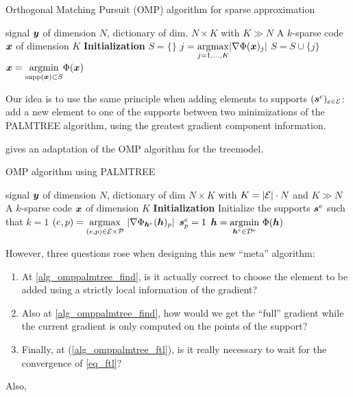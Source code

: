 \begin{algorithm}[!ht]
    \caption{Orthogonal Matching Pursuit (OMP) algorithm for sparse approximation}\label{alg_omp}
  \begin{algorithmic}[1]
    \Input signal $\bm{y}$ of dimension $N$, dictionary of dim. $N \times K$ with $K \gg N$
    \Output A $k$-sparse code $\bm{x}$ of dimension $K$
    \State \textbf{Initialization} $S=\{\}$
      \State $j =  \underset{j = 1,\dots,K}{\operatorname*{\arg\!\max}} | \nabla \Phi(\bm{x})_j |$ \label{alg_omp_pick_correlation}
      \State $S = S \cup \{j\}$
      \State $\bm{x} = \underset{\text{supp}(\bm{x}) \subset S}{\operatorname{argmin}} \Phi(\bm{x})$
    \EndFor
  \end{algorithmic}
\end{algorithm}

Our idea is to use the same principle when adding elements to supports $(\bm{s}^e)_{e \in \mathcal E}$: add a new element to one of the supports between two minimizations of the \ac{PALMTREE} algorithm, using the greatest gradient component information.

 gives an adaptation of the \ac{OMP} algorithm for the \gls{treemodel}.

\begin{algorithm}[!ht]
    \caption{\ac{OMP} algorithm using \ac{PALMTREE}}\label{alg_omppalmtree}
  \begin{algorithmic}[1]
    \Input signal $\bm{y}$ of dimension $N$, dictionary of dim $N \times K$ with $K = |\mathcal E| \cdot N$ and $K \gg N$
    \Output A $k$-sparse code $\bm{x}$ of dimension $K$
    \State \textbf{Initialization} Initialize the supports $\bm{s}^e$ such that $k=1$
      \State $(e,p) = \underset{(e,p) \in \mathcal E \times \mathcal P}{\operatorname*{\arg\!\max}}~ |\nabla \Phi_{\bm{h}^e}(\bm{h})_p|$ \label{alg_omppalmtree_find}
      \State $\bm{s}^e_p = 1$
      \State $\bm{h} = \underset{\bm{h}^e \in {\mathcal D}^e}{\operatorname{argmin}}~ \Phi(\bm{h})$  \label{alg_omppalmtree_ftl}
    \EndFor
  \end{algorithmic}
\end{algorithm}


However, three questions rose when designing this new “meta” algorithm:
\begin{enumerate}[label={\alph*)},noitemsep]
	\item At \cref{alg_omppalmtree_find}, is it actually correct to choose the element to be added using a strictly local information of the gradient?
	\item Also at \cref{alg_omppalmtree_find}, how would we get the “full” gradient while the current gradient is only computed on the points of the support?
	\item Finally, at (\cref{alg_omppalmtree_ftl}), is it really necessary to wait for the convergence of \eqref{eq_ftl}?
\end{enumerate}
  Also, 

